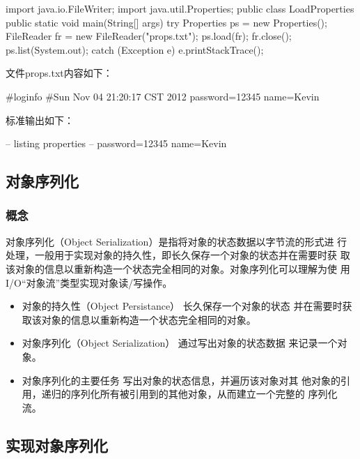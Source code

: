 
\begin{javaCode}
  import java.io.FileWriter;
  import java.util.Properties;
  public class LoadProperties {
    public static void main(String[] args) {
      try {
        Properties ps = new Properties();
        FileReader fr = new FileReader("props.txt");
        ps.load(fr);
        fr.close();
        ps.list(System.out);
      } catch (Exception e) {
        e.printStackTrace();
      }
    }
  }
\end{javaCode}

文件props.txt内容如下：

\begin{shCode}
#loginfo
#Sun Nov 04 21:20:17 CST 2012
password=12345
name=Kevin
\end{shCode}

标准输出如下：

\begin{stdoutCode}
-- listing properties --
password=12345
name=Kevin
\end{stdoutCode}

\subsection{对象序列化}

\subsubsection{概念}

对象序列化（Object Serialization）是指将对象的状态数据以字节流的形式进
行处理，一般用于实现对象的持久性，即长久保存一个对象的状态并在需要时获
取该对象的信息以重新构造一个状态完全相同的对象。对象序列化可以理解为使
用I/O“对象流”类型实现对象读/写操作。

\begin{itemize}\kai
\item {\hei 对象的持久性（Object Persistance）} 长久保存一个对象的状态
  并在需要时获取该对象的信息以重新构造一个状态完全相同的对象。
\item {\hei 对象序列化（Object Serialization）} 通过写出对象的状态数据
  来记录一个对象。
\item {\hei 对象序列化的主要任务} 写出对象的状态信息，并遍历该对象对其
  他对象的引用，递归的序列化所有被引用到的其他对象，从而建立一个完整的
  序列化流。
\end{itemize}

\subsection{实现对象序列化}

